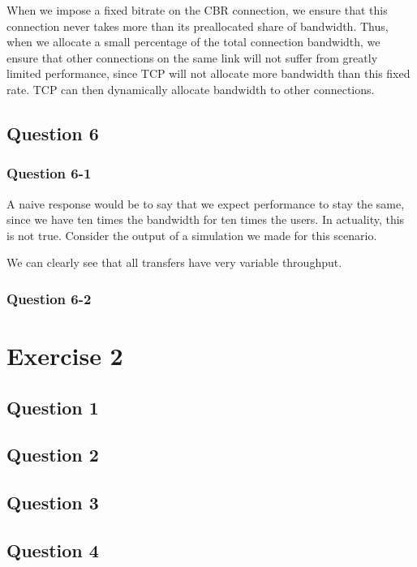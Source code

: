 \documentclass[10pt,a4paper]{article}
\begin{document}
When we impose a fixed bitrate on the CBR connection, we ensure that
this connection never takes more than its preallocated share of
bandwidth. Thus, when we allocate a small percentage of the total
connection bandwidth, we ensure that other connections on the same
link will not suffer from greatly limited performance, since TCP will
not allocate more bandwidth than this fixed rate. TCP can then
dynamically allocate bandwidth to other connections.


\subsection{Question 6}

\subsubsection{Question 6-1}
A naive response would be to say that we expect performance to stay
the same, since we have ten times the bandwidth for ten times the
users. In actuality, this is not true. Consider the output of a
simulation we made for this scenario.

We can clearly see that all transfers have very variable throughput.

\subsubsection{Question 6-2}

\section{Exercise 2}
\subsection{Question 1}
\subsection{Question 2}
\subsection{Question 3}
\subsection{Question 4}
\end{document}
